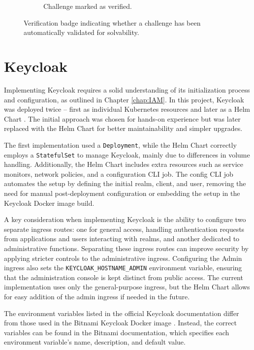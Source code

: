\begin{figure}[h]
\begin{subfigure}[b]{0.45\textwidth}
        \caption{Challenge marked as verified.}
        \label{fig:verified_badge}
    \end{subfigure}
    \caption{Verification badge indicating whether a challenge has been automatically validated for solvability.}
    \label{fig:verification_badge}
\end{figure}

\section{Keycloak}
Implementing Keycloak requires a solid understanding of its initialization process and configuration, as outlined in Chapter \ref{chap:IAM}. In this project, Keycloak was deployed twice -- first as individual Kubernetes resources and later as a Helm Chart \Parencite{bitnamiKeycloakHelm}. The initial approach was chosen for hands-on experience but was later replaced with the Helm Chart for better maintainability and simpler upgrades.

The first implementation used a \texttt{Deployment}, while the Helm Chart correctly employs a \texttt{StatefulSet} to manage Keycloak, mainly due to differences in volume handling. Additionally, the Helm Chart includes extra resources such as service monitors, network policies, and a configuration CLI job. The config CLI job automates the setup by defining the initial realm, client, and user, removing the need for manual post-deployment configuration or embedding the setup in the Keycloak Docker image build.

A key consideration when implementing Keycloak is the ability to configure two separate ingress routes: one for general access, handling authentication requests from applications and users interacting with realms, and another dedicated to administrative functions. Separating these ingress routes can improve security by applying stricter controls to the administrative ingress. Configuring the Admin ingress also sets the \texttt{KEYCLOAK\_HOSTNAME\_ADMIN} environment variable, ensuring that the administration console is kept distinct from public access. The current implementation uses only the general-purpose ingress, but the Helm Chart allows for easy addition of the admin ingress if needed in the future.

The environment variables listed in the official Keycloak documentation differ from those used in the Bitnami Keycloak Docker image \parencite{bitnamiKeycloak}. Instead, the correct variables can be found in the Bitnami documentation, which specifies each environment variable's name, description, and default value.

